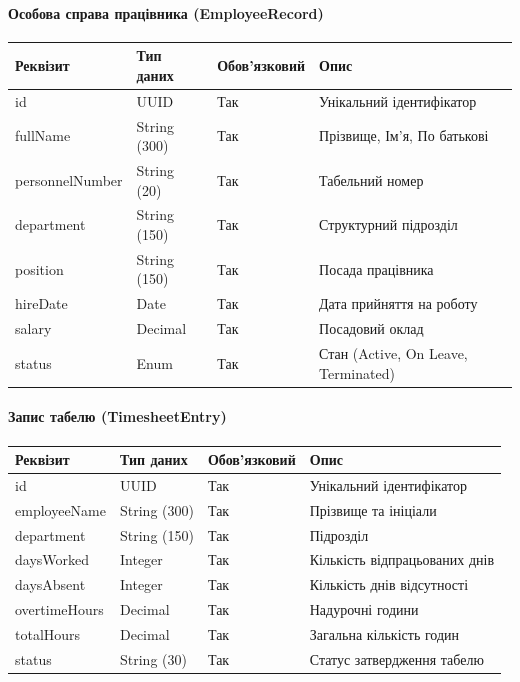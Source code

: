 \documentclass{article}
\begin{document}
\paragraph{Особова справа працівника (EmployeeRecord)}
\begin{longtable}{p{3.5cm}p{3cm}p{2cm}p{5.5cm}}
\toprule
\textbf{Реквізит} & \textbf{Тип даних} & \textbf{Обов'язковий} & \textbf{Опис} \\
\midrule
id & UUID & Так & Унікальний ідентифікатор \\
fullName & String (300) & Так & Прізвище, Ім'я, По батькові \\
personnelNumber & String (20) & Так & Табельний номер \\
department & String (150) & Так & Структурний підрозділ \\
position & String (150) & Так & Посада працівника \\
hireDate & Date & Так & Дата прийняття на роботу \\
salary & Decimal & Так & Посадовий оклад \\
status & Enum & Так & Стан (Active, On Leave, Terminated) \\
\bottomrule
\end{longtable}

\paragraph{Запис табелю (TimesheetEntry)}
\begin{longtable}{p{3.5cm}p{3.5cm}p{2cm}p{5cm}}
\toprule
\textbf{Реквізит} & \textbf{Тип даних} & \textbf{Обов'язковий} & \textbf{Опис} \\
\midrule
id & UUID & Так & Унікальний ідентифікатор \\
employeeName & String (300) & Так & Прізвище та ініціали \\
department & String (150) & Так & Підрозділ \\
daysWorked & Integer & Так & Кількість відпрацьованих днів \\
daysAbsent & Integer & Так & Кількість днів відсутності \\
overtimeHours & Decimal & Так & Надурочні години \\
totalHours & Decimal & Так & Загальна кількість годин \\
status & String (30) & Так & Статус затвердження табелю \\
\bottomrule
\end{longtable}
\end{document}
